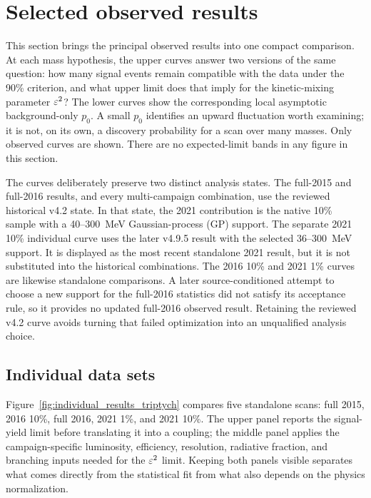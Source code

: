 \section{Selected observed results}
\label{sec:selected-observed-results}


This section brings the principal observed results into one compact comparison.
At each mass hypothesis, the upper curves answer two versions of the same question:
how many signal events remain compatible with the data under the 90\% \CLs{}
criterion, and what
upper limit does that imply for the kinetic-mixing parameter $\varepsilon^2$?  The lower
curves show the corresponding local asymptotic background-only $p_0$.  A small
$p_0$ identifies an upward fluctuation worth examining; it is not, on its own, a
discovery probability for a scan over many masses.  Only observed curves are shown.
There are no expected-limit bands in any figure in this section.

The curves deliberately preserve two distinct analysis states.  The full-2015 and
full-2016 results, and every multi-campaign combination, use the reviewed historical
v4.2 state.  In that state, the 2021 contribution is the native 10\% sample with a
40--300~MeV Gaussian-process (GP) support.  The separate 2021 10\% individual curve
uses the later v4.9.5 result with the selected 36--300~MeV support.  It is displayed
as the most recent standalone 2021 result, but it is not substituted into the
historical combinations.  The 2016 10\% and 2021 1\% curves are likewise standalone
comparisons.  A later source-conditioned attempt to choose a new support for the
full-2016 statistics did not satisfy its acceptance rule, so it provides no updated
full-2016 observed result.  Retaining the reviewed v4.2 curve avoids turning that
failed optimization into an unqualified analysis choice.

\subsection{Individual data sets}
\label{sec:selected-individual-results}

Figure~\ref{fig:individual_results_triptych} compares five standalone scans: full
2015, 2016 10\%, full 2016, 2021 1\%, and 2021 10\%.  The upper panel reports the
signal-yield limit before translating it into a coupling; the middle panel applies
the campaign-specific luminosity, efficiency, resolution, radiative fraction, and
branching inputs needed for the $\varepsilon^2$ limit.  Keeping both panels visible separates
what comes directly from the statistical fit from what also depends on the physics
normalization.

